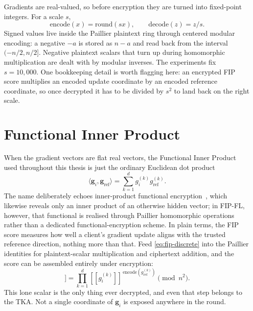 Gradients are real-valued, so before encryption they are turned into fixed-point integers. For a scale $s$,
\begin{equation}
    \mathrm{encode}(x)=\mathrm{round}(sx),\qquad
    \mathrm{decode}(z)=z/s.
    \label{eq:fixed-point}
\end{equation}
Signed values live inside the Paillier plaintext ring through centered modular encoding: a negative $-a$ is stored as $n-a$ and read back from the interval $(-n/2,n/2]$. Negative plaintext scalars that turn up during homomorphic multiplication are dealt with by modular inverses. The experiments fix $s=10{,}000$. One bookkeeping detail is worth flagging here: an encrypted FIP score multiplies an encoded update coordinate by an encoded reference coordinate, so once decrypted it has to be divided by $s^2$ to land back on the right scale.

\section{Functional Inner Product}
\label{sec:prelim-fip}

When the gradient vectors are flat real vectors, the Functional Inner Product used throughout this thesis is just the ordinary Euclidean dot product
\begin{equation}
    \langle \mathbf{g}_i,\mathbf{g}_{\mathrm{ref}}\rangle
        =\sum_{k=1}^{d}g_i^{(k)}g_{\mathrm{ref}}^{(k)}.
    \label{eq:fip-discrete}
\end{equation}
The name deliberately echoes inner-product functional encryption~\cite{abdalla2015simple}, which likewise reveals only an inner product of an otherwise hidden vector; in FIP-FL, however, that functional is realised through Paillier homomorphic operations rather than a dedicated functional-encryption scheme. In plain terms, the FIP score measures how well a client's gradient update aligns with the trusted reference direction, nothing more than that. Feed \eqref{eq:fip-discrete} into the Paillier identities for plaintext-scalar multiplication and ciphertext addition, and the score can be assembled entirely under encryption:
\begin{equation}
    [\![\langle \mathbf{g}_i,\mathbf{g}_{\mathrm{ref}}\rangle]\!]
    =
    \prod_{k=1}^{d}
    [\![g_i^{(k)}]\!]^{\,\mathrm{encode}(g_{\mathrm{ref}}^{(k)})}
    \pmod{n^2}.
    \label{eq:fip-homo}
\end{equation}
This lone scalar is the only thing ever decrypted, and even that step belongs to the TKA. Not a single coordinate of $\mathbf{g}_i$ is exposed anywhere in the round.

